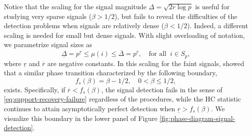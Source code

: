 Notice that the scaling for the signal magnitude $\Delta = \sqrt{2r\log{p}}$ is useful for studying very sparse signals ($\beta>1/2$), but fails to reveal the difficulties of the detection problems when signals are relatively dense ($\beta<1/2$).
Indeed, a different scaling is needed for small but dense signals.
With slight overloading of notation, we parametrize signal sizes as 
\begin{equation} \label{eq:signal-size-small} 
    \underline{\Delta} = p^{\underline{r}}
    \le \mu(i) \le
    \overline{\Delta} = p^{\overline{r}}, \quad \text{for all}\;\;i\in S_p,
\end{equation}
where $\underline{r}$ and $\overline{r}$ are negative constants.
In this scaling for the faint signals, \citet{cai2011optimal} showed that a similar phase transition characterized by the following boundary,
\begin{equation} \label{eq:detection-boundary-small-signals}
    f_s(\beta) = \beta - 1/2, \quad 0 < \beta \le 1/2,
\end{equation} 
exists.
Specifically, if $\overline{r}<f_s(\beta)$, the signal detection fails in the sense of \eqref{eq:support-recovery-failure} regardless of the procedures, while the \ac{HC} statistic continues to attain asymptotically perfect detection when $\underline{r}>f_s(\beta)$. 
We visualize this boundary in the lower panel of Figure \ref{fig:phase-diagram-signal-detection}.

